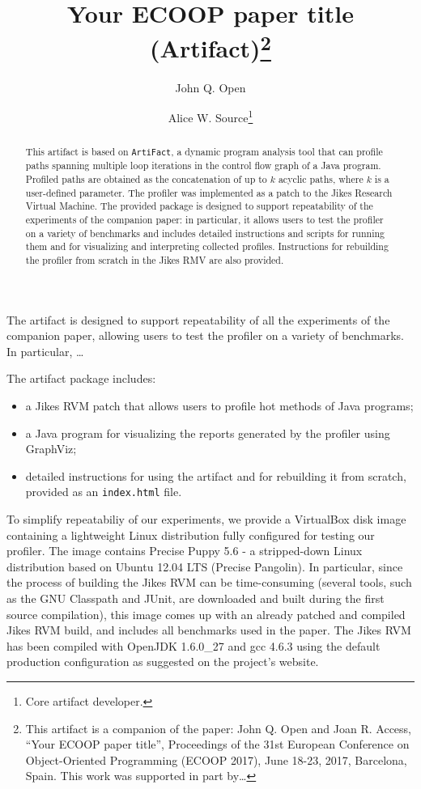 \documentclass[a4paper,UKenglish]{darts}
\title{Your ECOOP paper title (Artifact)\footnote{This artifact is a companion of the paper:  John Q. Open and Joan R. Access, ``Your ECOOP paper title'', Proceedings of the 31st European Conference on Object-Oriented Programming (ECOOP 2017), June 18-23, 2017, Barcelona, Spain. This work was supported in part by\ldots}}
\author[1]{John Q. Open}
\author[2]{Alice W. Source\footnote{Core artifact developer.}}
\affil[1]{Dummy University Computing Laboratory, Address/City, Country\\
  \texttt{open@dummyuniversity.org}}
\affil[2]{Department of Informatics, Dummy College, Address/City, Country\\
  \texttt{access@dummycollege.org}}
\begin{document}
\maketitle

\begin{abstract}
  This artifact is based on {\tt ArtiFact}, a dynamic program analysis tool that
  can profile paths spanning multiple loop iterations in the control flow
  graph of a Java program. Profiled paths are obtained as the concatenation of
  up to $k$ acyclic paths, where $k$ is a user-defined parameter. The profiler was
  implemented as a patch to the Jikes Research Virtual Machine. The provided
  package is designed to support repeatability of the experiments of the
  companion paper: in particular, it allows users to test the profiler on a variety of
  benchmarks and includes detailed instructions and scripts for running them
  and for visualizing and interpreting collected profiles. Instructions for
  rebuilding the profiler from scratch in the Jikes RMV are also provided.
 \end{abstract}


\begin{scope}
  The artifact is designed to support repeatability of all the experiments of the 
  companion paper, allowing users to test the profiler on a variety of benchmarks. In particular, \ldots
\end{scope}

\begin{content}
  The artifact package includes:
  \begin{itemize}
  \item a Jikes RVM patch that allows users to profile hot methods of Java programs;
  \item a Java program for visualizing the reports generated by the profiler using GraphViz;
  \item detailed instructions for using the artifact and for rebuilding it from scratch, provided as an {\tt index.html} file.
  \end{itemize}
  To simplify repeatabiliy of our experiments, we provide a VirtualBox disk
  image containing a lightweight Linux distribution fully configured for
  testing our profiler. The image contains Precise Puppy 5.6 - a stripped-down
  Linux distribution based on Ubuntu 12.04 LTS (Precise Pangolin). In
  particular, since the process of building the Jikes RVM can be
  time-consuming (several tools, such as the GNU Classpath and JUnit, are
  downloaded and built during the first source compilation), this image comes
  up with an already patched and compiled Jikes RVM build, and includes all
  benchmarks used in the paper. The Jikes RVM has been compiled with OpenJDK
  1.6.0\_27 and gcc 4.6.3 using the default production configuration as
  suggested on the project's website. 
\end{content} 
\end{document}
